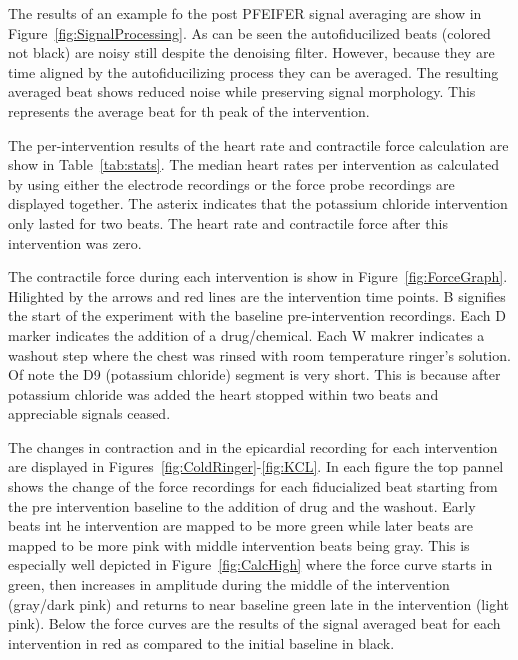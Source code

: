\documentclass[12pt]{article}
\begin{document}
\par{}
The results of an example fo the post PFEIFER signal averaging are show in Figure~\ref{fig:SignalProcessing}. As can be seen the autofiducilized beats (colored not black) are noisy still despite the denoising filter. However, because they are time aligned by the autofiducilizing process they can be averaged. The resulting averaged beat shows reduced noise while preserving signal morphology. This represents the average beat for th peak of the intervention.

\par{}
The per-intervention results of the heart rate and contractile force calculation are show in Table~\ref{tab:stats}. The median heart rates per intervention as calculated by using either the electrode recordings or the force probe recordings are displayed together. The asterix indicates that the potassium chloride intervention only lasted for two beats. The heart rate and contractile force after this intervention was zero. 

\par{}
The contractile force during each intervention is show in Figure~\ref{fig:ForceGraph}. Hilighted by the arrows and red lines are the intervention time points. B signifies the start of the experiment with the baseline pre-intervention recordings. Each D marker indicates the addition of a drug/chemical. Each W makrer indicates a washout step where the chest was rinsed with room temperature ringer's solution. Of note the D9 (potassium chloride) segment is very short. This is because after potassium chloride was added the heart stopped within two beats and appreciable signals ceased. 

\par{}
The changes in contraction and in the epicardial recording for each intervention are displayed in Figures~\ref{fig:ColdRinger}-\ref{fig:KCL}. In each figure the top pannel shows the change of the force recordings for each fiducialized beat starting from the pre intervention baseline to the addition of drug and the washout. Early beats int he intervention are mapped to be more green while later beats are mapped to be more pink with middle intervention beats being gray. This is especially well depicted in Figure~\ref{fig:CalcHigh} where the force curve starts in green, then increases in amplitude during the middle of the intervention (gray/dark pink) and returns to near baseline green late in the intervention (light pink). Below the force curves are the results of the signal averaged beat for each intervention in red as compared to the initial baseline in black.
\end{document}
